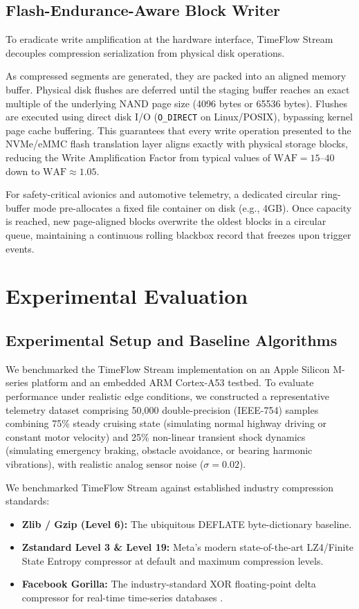 \documentclass[journal]{IEEEtran}
\begin{document}
\subsection{Flash-Endurance-Aware Block Writer}
To eradicate write amplification at the hardware interface, TimeFlow Stream decouples compression serialization from physical disk operations. 

As compressed segments are generated, they are packed into an aligned memory buffer. Physical disk flushes are deferred until the staging buffer reaches an exact multiple of the underlying NAND page size (4096 bytes or 65536 bytes). Flushes are executed using direct disk I/O (\texttt{O\_DIRECT} on Linux/POSIX), bypassing kernel page cache buffering. This guarantees that every write operation presented to the NVMe/eMMC flash translation layer aligns exactly with physical storage blocks, reducing the Write Amplification Factor from typical values of $\text{WAF} = 15\text{--}40$ down to $\text{WAF} \approx 1.05$.

For safety-critical avionics and automotive telemetry, a dedicated circular ring-buffer mode pre-allocates a fixed file container on disk (e.g., 4GB). Once capacity is reached, new page-aligned blocks overwrite the oldest blocks in a circular queue, maintaining a continuous rolling blackbox record that freezes upon trigger events.

\section{Experimental Evaluation}

\subsection{Experimental Setup and Baseline Algorithms}
We benchmarked the TimeFlow Stream implementation on an Apple Silicon M-series platform and an embedded ARM Cortex-A53 testbed. To evaluate performance under realistic edge conditions, we constructed a representative telemetry dataset comprising 50,000 double-precision (IEEE-754) samples combining 75\% steady cruising state (simulating normal highway driving or constant motor velocity) and 25\% non-linear transient shock dynamics (simulating emergency braking, obstacle avoidance, or bearing harmonic vibrations), with realistic analog sensor noise ($\sigma = 0.02$).

We benchmarked TimeFlow Stream against established industry compression standards:
\begin{itemize}
    \item \textbf{Zlib / Gzip (Level 6):} The ubiquitous DEFLATE byte-dictionary baseline.
    \item \textbf{Zstandard Level 3 \& Level 19:} Meta's modern state-of-the-art LZ4/Finite State Entropy compressor at default and maximum compression levels.
    \item \textbf{Facebook Gorilla:} The industry-standard XOR floating-point delta compressor for real-time time-series databases \cite{pelkonen2015gorilla}.
\end{itemize}
\end{document}
